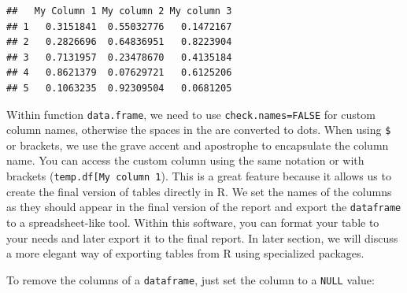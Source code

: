 \documentclass[11pt,]{book}
\newenvironment{Shaded}{\begin{snugshade}}{\end{snugshade}}
\newcommand{\KeywordTok}[1]{\textcolor[rgb]{0.27,0.27,0.27}{\textbf{#1}}}
\newcommand{\DataTypeTok}[1]{\textcolor[rgb]{0.27,0.27,0.27}{#1}}
\newcommand{\DecValTok}[1]{\textcolor[rgb]{0.06,0.06,0.06}{#1}}
\newcommand{\StringTok}[1]{\textcolor[rgb]{0.5,0.5,0.5}{#1}}
\newcommand{\CommentTok}[1]{\textcolor[rgb]{0.56,0.35,0.01}{\textit{#1}}}
\newcommand{\OtherTok}[1]{\textcolor[rgb]{0.56,0.35,0.01}{#1}}
\newcommand{\OperatorTok}[1]{\textcolor[rgb]{0.81,0.36,0.00}{\textbf{#1}}}
\newcommand{\NormalTok}[1]{#1}
\begin{document}
\begin{Shaded}
\end{Shaded}

\begin{verbatim}
##   My Column 1 My column 2 My column 3
## 1   0.3151841  0.55032776   0.1472167
## 2   0.2826696  0.64836951   0.8223904
## 3   0.7131957  0.23478670   0.4135184
## 4   0.8621379  0.07629721   0.6125206
## 5   0.1063235  0.92309504   0.0681205
\end{verbatim}

Within function \texttt{data.frame}, we need to use
\texttt{check.names=FALSE} for custom column names, otherwise the spaces
in the are converted to dots. When using \texttt{\$} or brackets, we use
the grave accent and apostrophe to encapsulate the column name. You can
access the custom column using the same notation or with brackets
(\texttt{temp.df{[}\textquotesingle{}My\ column\ 1\textquotesingle{}{]}}).
This is a great feature because it allows us to create the final version
of tables directly in R. We set the names of the columns as they should
appear in the final version of the report and export the
\texttt{dataframe} to a spreadsheet-like tool. Within this software, you
can format your table to your needs and later export it to the final
report. In later section, we will discuss a more elegant way of
exporting tables from R using specialized packages.

To remove the columns of a \texttt{dataframe}, just set the column to a
\texttt{NULL} value: 
\end{document}
